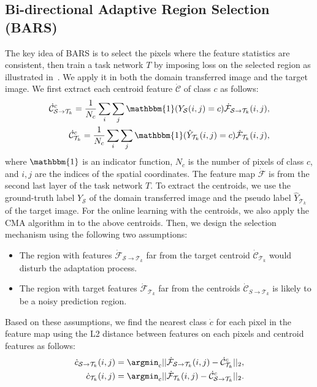 \subsection{Bi-directional Adaptive Region Selection (BARS)}
\label{sec:BARS}

The key idea of BARS is to select the pixels where the feature statistics are consistent, then train a task network $T$ by imposing loss on the selected region as illustrated in~.
We apply it in both the domain transferred image and the target image.
We first extract each centroid feature $\dot{\mathcal{C}}$ of class $c$ as follows:
\begin{gather}
\begin{split}
\dot{\mathcal{C}}_{\mathcal{S}\to \mathcal{T}_k}^{c}
= \frac{1}{N_c}\sum_{i} \sum_{j} 
{\mathbbm{1}(Y_\mathcal{S}(i, j)=c)} \dot{\mathcal{F}}_{\mathcal{S}\to \mathcal{T}_k}(i, j),\\
\dot{\mathcal{C}}_{\mathcal{T}_k}^{c} = \frac{1}{N_c}\sum_{i} \sum_{j} 
{\mathbbm{1}(\hat{Y}_{\mathcal{T}_k}(i, j)=c)} \dot{\mathcal{F}}_{\mathcal{T}_k}(i, j),
\end{split}
\label{eq:centroid}
\end{gather}
where $\mathbbm{1}$ is an indicator function, $N_c$ is the number of pixels of class $c$, and $i, j$ are the indices of the spatial coordinates.
The feature map $\dot{\mathcal{F}}$ is from the second last layer of the task network $T$.
To extract the centroids, we use the ground-truth label $Y_\mathcal{S}$ of the domain transferred image and the pseudo label $\hat{Y}_{\mathcal{T}_k}$ of the target image.
For the online learning with the centroids, we also apply the CMA algorithm in  to the above centroids.
Then, we design the selection mechanism using the following two assumptions:
\begin{itemize}
\item The region with features $\dot{\mathcal{F}}_{\mathcal{S}\to \mathcal{T}_k}$ far from the target centroid $\dot{\mathcal{C}}_{\mathcal{T}_k}$ would disturb the adaptation process.
\item The region with target features $\dot{\mathcal{F}}_{\mathcal{T}_k}$ far from the centroids $\dot{\mathcal{C}}_{S\to \mathcal{T}_k}$ is likely to be a noisy prediction region.
\end{itemize}
Based on these assumptions, we find the nearest class $\dot{c}$ for each pixel in the feature map using the L2 distance between features on each pixels and centroid features as follows:
\begin{gather}
\begin{split}
\dot{c}_{\mathcal{S}\to \mathcal{T}_k}(i, j) = \argmin_c || \dot{\mathcal{F}}_{\mathcal{S}\to \mathcal{T}_k}(i, j) - \dot{\mathcal{C}}^{c}_{\mathcal{T}_k} ||_2, \\
\dot{c}_{\mathcal{T}_k}(i, j) = \argmin_c || \dot{\mathcal{F}}_{\mathcal{T}_k}(i, j) - \dot{\mathcal{C}}_{\mathcal{S}\to \mathcal{T}_k}^c ||_2.
\end{split}
\end{gather}
